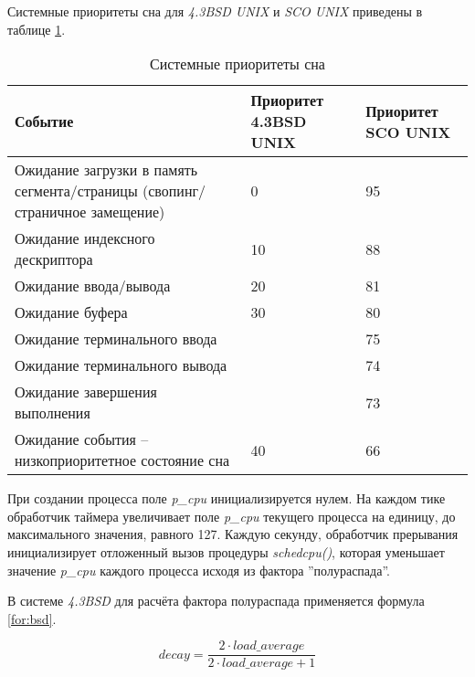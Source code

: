 Системные приоритеты сна для \textit{4.3BSD UNIX} и \textit{SCO UNIX} приведены в таблице \ref{tbl:book}.

\begin{table}[h]
    \begin{center}
        \begin{threeparttable}
        \captionsetup{justification=raggedright,singlelinecheck=off}
        \caption{Системные приоритеты сна}
        \label{tbl:book}
        \begin{tabular}{|p{80mm}|p{40mm}|p{30mm}|}
            \hline
            Событие & Приоритет 4.3BSD UNIX  & Приоритет SCO UNIX \\ \hline
            Ожидание загрузки в память сегмента/страницы (свопинг/страничное замещение) & 0 & 95\\ \hline
            Ожидание индексного дескриптора & 10 & 88\\ \hline
            Ожидание ввода/вывода & 20 & 81\\ \hline
            Ожидание буфера & 30 & 80\\ \hline
            Ожидание терминального ввода & & 75\\ \hline
            Ожидание терминального вывода &  & 74\\ \hline
            Ожидание завершения выполнения & & 73\\ \hline
            Ожидание события -- низкоприоритетное состояние сна & 40 & 66 \\ \hline                                            
		\end{tabular}
    \end{threeparttable}
\end{center}
\end{table}

При создании процесса поле \textit{p\_cpu} инициализируется нулем. На каждом тике обработчик таймера увеличивает поле \textit{p\_cpu} текущего процесса на единицу, до максимального значения, равного 127. Каждую секунду, обработчик прерывания инициализирует отложенный вызов процедуры \textit{schedcpu()}, которая уменьшает значение \textit{p\_cpu} каждого процесса исходя из фактора ''полураспада''.

В системе \textit{4.3BSD} для расчёта фактора полураспада применяется формула
\eqref{for:bsd}.

\begin{equation}
    \label{for:bsd}
    decay = \frac{2 \cdot load\_average}{2 \cdot load\_average + 1}
\end{equation}

